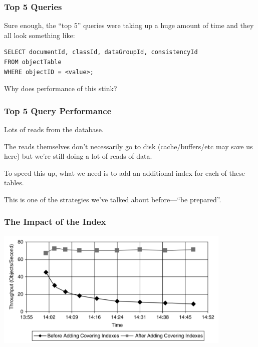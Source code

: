 \begin{frame}[fragile]
\frametitle{Top 5 Queries}

\large
\begin{changemargin}{1cm}
Sure enough, the ``top 5'' queries were taking up a huge amount of time and they all look something like:
\end{changemargin}
\begin{verbatim}
SELECT documentId, classId, dataGroupId, consistencyId 
FROM objectTable 
WHERE objectID = <value>;
\end{verbatim}

\large
\begin{changemargin}{1cm}
Why does performance of this stink?
\end{changemargin}

\end{frame}



\begin{frame}
\frametitle{Top 5 Query Performance}

\large
\begin{changemargin}{1cm}
Lots of reads from the database. 

The reads themselves don't necessarily go to disk (cache/buffers/etc may save us here) but we're still doing a lot of reads of data. 

To speed this up, what we need is to add an additional index for each of these tables. 

This is one of the strategies we've talked about before---``be prepared''.
\end{changemargin}


\end{frame}



\begin{frame}
\frametitle{The Impact of the Index}

\begin{center}
	\includegraphics[width=0.85\textwidth]{images/adding-indexes.png}
\end{center}

\end{frame}



